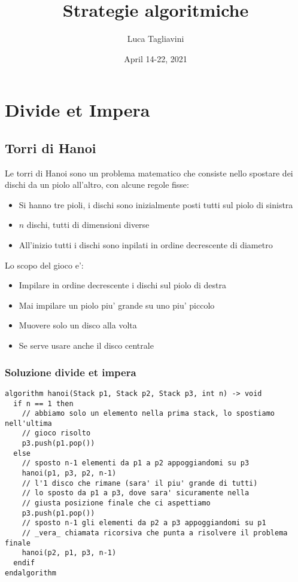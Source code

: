 \documentclass{article}
\title{\textbf{Strategie algoritmiche}}
\author{Luca Tagliavini}
\date{April 14-22, 2021}
\begin{document}
\maketitle
\tableofcontents
\pagebreak

\section{Divide et Impera}

\subsection{Torri di Hanoi}

Le torri di Hanoi sono un problema matematico che consiste nello spostare dei
dischi da un piolo all'altro, con alcune regole fisse:
\begin{itemize}
  \item Si hanno tre pioli, i dischi sono inizialmente posti tutti sul piolo di sinistra
  \item $n$ dischi, tutti di dimensioni diverse
  \item All'inizio tutti i dischi sono inpilati in ordine decrescente di diametro
\end{itemize}

Lo scopo del gioco e':
\begin{itemize}
  \item Impilare in ordine decrescente i dischi sul piolo di destra
  \item Mai impilare un piolo piu' grande su uno piu' piccolo
  \item Muovere solo un disco alla volta
  \item Se serve usare anche il disco centrale
\end{itemize}

\subsubsection{Soluzione divide et impera}

\begin{lstlisting}
algorithm hanoi(Stack p1, Stack p2, Stack p3, int n) -> void
  if n == 1 then
    // abbiamo solo un elemento nella prima stack, lo spostiamo nell'ultima
    // gioco risolto
    p3.push(p1.pop())
  else
    // sposto n-1 elementi da p1 a p2 appoggiandomi su p3
    hanoi(p1, p3, p2, n-1)
    // l'1 disco che rimane (sara' il piu' grande di tutti)
    // lo sposto da p1 a p3, dove sara' sicuramente nella
    // giusta posizione finale che ci aspettiamo
    p3.push(p1.pop())
    // sposto n-1 gli elementi da p2 a p3 appoggiandomi su p1
    // _vera_ chiamata ricorsiva che punta a risolvere il problema finale
    hanoi(p2, p1, p3, n-1)
  endif
endalgorithm
\end{lstlisting}
\end{document}
